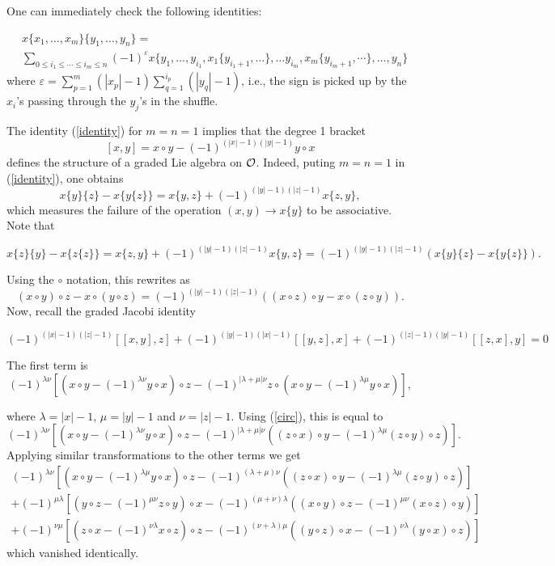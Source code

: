 \documentclass[TFM.tex]{subfiles}
\begin{document}
One can immediately check the following identities:

\begin{equation}\label{identity}
\begin{aligned}
&x\{x_1, \dots , x_m\}\{y_1, \dots , y_n\}=\\
&\sum_{0\leq i_1\leq\cdots\leq i_m\leq n}(-1)^\varepsilon x\{y_1,\dots, y_{i_1}, x_1\{y_{i_1+1},\dots\},\dots y_{i_m}, x_m\{y_{i_m+1},\cdots\},\dots, y_n\}
\end{aligned}
\end{equation}
where $\varepsilon =\sum^m_{p=1}(|x_p|-1)\sum^{i_p}_{q=1}(|y_q|-1)$, i.e., the sign is picked up by the $x_i$’s passing through the
$y_j$’s in the shuffle.


\begin{remark}
The identity (\ref{identity}) for $m=n=1$ implies that the degree 1 bracket
\[
[x,y]=x\circ y-(-1)^{(|x|-1)(|y|-1)}y\circ x
\]
defines the structure of a graded Lie algebra on ${\mathcal O}$. Indeed, puting $m = n = 1$ in (\ref{identity}), one obtains 
$$x\{y\}\{z\} − x\{y\{z\}\} = x\{y, z\} + (−1)^{(|y|-1)(|z|-1)}x\{z, y\},$$ %
which measures the failure of the operation $(x, y) → x\{y\}$ to be associative.  Note that

$$x\{z\}\{y\} − x\{z\{z\}\}=x\{z, y\} + (−1)^{(|y|-1)(|z|-1)}x\{y,z\}=(-1)^{(|y|-1)(|z|-1)}(x\{y\}\{z\} − x\{y\{z\}\}).$$

Using the $\circ$ notation, this rewrites as
\begin{equation}\label{circ}
(x\circ y)\circ z-x\circ(y\circ z)=(−1)^{(|y|-1)(|z|-1)}((x\circ z)\circ y- x\circ (z\circ y)).
\end{equation}
Now, recall the graded Jacobi identity 

$$(-1)^{(|x|-1)(|z|-1)}[[x,y],z]+(-1)^{(|y|-1)(|x|-1)}[[y,z],x]+(-1)^{(|z|-1)(|y|-1)}[[z,x],y]=0$$

The first term is 
\[
(-1)^{\lambda\nu}[(x\circ y -(-1)^{\lambda\nu}y\circ x)\circ z-(-1)^{|\lambda+\mu|\nu}z\circ(x\circ y-(-1)^{\lambda\mu}y\circ x)],
\]

where $\lambda=|x|-1$, $\mu=|y|-1$ and $\nu=|z|-1$. Using (\ref{circ}), this is equal to
\[
(-1)^{\lambda\nu}[(x\circ y -(-1)^{\lambda\nu}y\circ x)\circ z-(-1)^{|\lambda+\mu|\nu}((z\circ x)\circ y-(-1)^{\lambda\mu}(z\circ y)\circ z)].
\]
Applying similar transformations to the other terms we get
\begin{gather*}
(-1)^{\lambda\nu}[(x\circ y -(-1)^{\lambda\mu}y\circ x)\circ z-(-1)^{(\lambda+\mu)\nu}((z\circ x)\circ y-(-1)^{\lambda\mu}(z\circ y)\circ z)]\\
+(-1)^{\mu\lambda}[(y\circ z -(-1)^{\mu\nu}z\circ y)\circ x-(-1)^{(\mu+\nu)\lambda}((x\circ y)\circ z-(-1)^{\mu\nu}(x\circ z)\circ y)]\\
+(-1)^{\nu\mu}[(z\circ x -(-1)^{\nu\lambda}x\circ z)\circ z-(-1)^{(\nu+\lambda)\mu}((y\circ z)\circ x-(-1)^{\nu\lambda}(y\circ x)\circ z)]
\end{gather*}
which vanished identically.
\end{remark}
\end{document}
